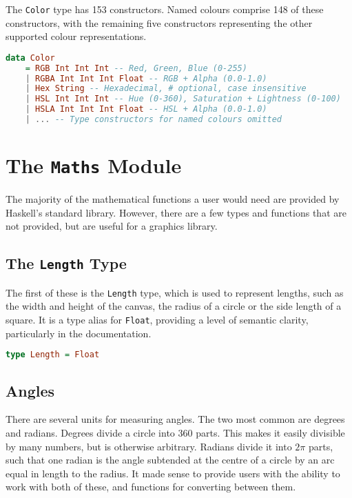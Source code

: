 \documentclass[../main.tex]{subfiles}
\begin{document}
            The \texttt{Color} type has 153 constructors.
            Named colours comprise 148 of these constructors, with the remaining five
                constructors representing the other supported colour representations.

            \begin{lstlisting}[language={Haskell}, label={lst:color}, caption={The \texttt{Color} 
                type definition.
                Named colours have been omitted, but are included in the actual implementation (see 
                Appendix~\ref{app:code}).}]
data Color
    = RGB Int Int Int -- Red, Green, Blue (0-255)
    | RGBA Int Int Int Float -- RGB + Alpha (0.0-1.0)
    | Hex String -- Hexadecimal, # optional, case insensitive
    | HSL Int Int Int -- Hue (0-360), Saturation + Lightness (0-100)
    | HSLA Int Int Int Float -- HSL + Alpha (0.0-1.0)
    | ... -- Type constructors for named colours omitted\end{lstlisting}

    \section{The \texttt{Maths}
        Module} The majority of the mathematical functions a user would need are
            provided by Haskell's standard library.
        However, there are a few types and functions that are not provided, but are
            useful for a graphics library.

        \subsection{The \texttt{Length}
            Type} The first of these is the \texttt{Length} type, which is used to
                represent lengths, such as the width and height of the canvas, the radius of a
                circle or the side length of a square.
            It is a type alias for \texttt{Float}, providing a level of semantic clarity,
                particularly in the documentation.
            \begin{lstlisting}[language={Haskell}, label={lst:length}, caption={The \texttt{Length} 
                type definition.}]
type Length = Float\end{lstlisting}

        \subsection{Angles}
            There are several units for measuring angles.
            The two most common are degrees and radians.
            Degrees divide a circle into 360 parts.
            This makes it easily divisible by many numbers, but is otherwise arbitrary.
            Radians divide it into $2\pi$ parts, such that one radian is the angle
                subtended at the centre of a circle by an arc equal in length to the radius.
            It made sense to provide users with the ability to work with both of these, and
                functions for converting between them.
\end{document}
